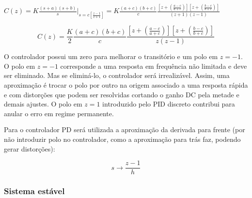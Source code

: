 \begin{center}
   $C(z) = K\frac{(s+a)(s+b)}{s}\Big|_{s=c\left[\frac{z-1}{z+1}\right]} = K\frac{(a+c)(b+c)}{c}\frac{\left[z+\left(\frac{a-c}{a+c}\right)\right]\left[z+\left(\frac{b-c}{b+c}\right)\right]}{(z+1)(z-1)}$
\end{center}

\begin{equation} \label{trans:bi:2}
    C(z) = \frac{K}{2}\frac{(a+c)(b+c)}{c}\frac{\left[z+\left(\frac{a-c}{a+c}\right)\right]\left[z+\left(\frac{b-c}{b+c}\right)\right]}{z(z-1)}
\end{equation}

O controlador possui um zero para melhorar o transitório e um polo em $z=-1$. O polo em $z=-1$ corresponde a uma resposta em frequência não limitada e deve ser eliminado. Mas se eliminá-lo, o controlador será irrealizável. Assim, uma aproximação é trocar o polo por outro na origem associado a uma resposta rápida e com distorções que podem ser resolvidas cortando o ganho DC pela metade e demais ajustes. O polo em $z=1$ introduzido pelo PID discreto contribui para anular o erro em regime permanente. 

Para o controlador PD será utilizada a aproximação da derivada para frente (por não introduzir polo no controlador, como a aproximação para trás faz, podendo gerar distorções):

\begin{equation} \label{trans:bi:1}
    s \rightarrow \frac{z-1}{h}
\end{equation}

\subsubsection{Sistema estável}

